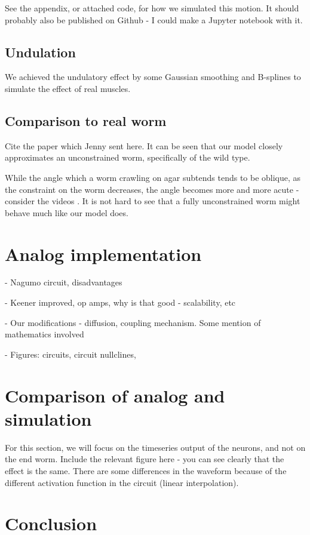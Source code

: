 \documentclass[
    11pt,
]{article}
\begin{document}
See the appendix, or attached code, for how we simulated this motion.  It should probably also be published on Github - I could make a Jupyter notebook with it.

\subsection{Undulation}

We achieved the undulatory effect by some Gaussian smoothing and B-splines to simulate the effect of real muscles.

\subsection{Comparison to real worm}

Cite the paper which Jenny sent here.  It can be seen that our model closely approximates an unconstrained worm, specifically of the wild type.

While the angle which a worm crawling on agar subtends tends to be oblique, as the constraint on the worm decreases, the angle becomes more and more acute - consider the videos . It is not hard to see that a fully unconstrained worm might behave much like our model does.

\section{Analog implementation}

- Nagumo circuit, disadvantages

- Keener improved, op amps, why is that good - scalability, etc

- Our modifications - diffusion, coupling mechanism.  Some mention of mathematics involved

- Figures: circuits, circuit nullclines,

\section{Comparison of analog and simulation}

For this section, we will focus on the timeseries output of the neurons, and not on the end worm.  Include the relevant figure here - you can see clearly that the effect is the same.  There are some differences in the waveform because of the different activation function in the circuit (linear interpolation).

\section{Conclusion}
\end{document}
